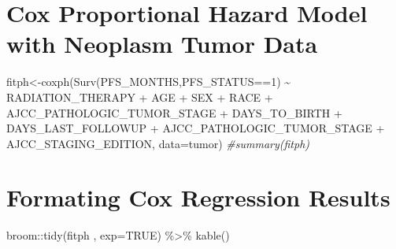 \documentclass[
  11pt,
]{article}
\newenvironment{Shaded}{\begin{snugshade}}{\end{snugshade}}
\newcommand{\AttributeTok}[1]{\textcolor[rgb]{0.77,0.63,0.00}{#1}}
\newcommand{\CommentTok}[1]{\textcolor[rgb]{0.56,0.35,0.01}{\textit{#1}}}
\newcommand{\ConstantTok}[1]{\textcolor[rgb]{0.00,0.00,0.00}{#1}}
\newcommand{\DecValTok}[1]{\textcolor[rgb]{0.00,0.00,0.81}{#1}}
\newcommand{\FunctionTok}[1]{\textcolor[rgb]{0.00,0.00,0.00}{#1}}
\newcommand{\NormalTok}[1]{#1}
\newcommand{\OtherTok}[1]{\textcolor[rgb]{0.56,0.35,0.01}{#1}}
\newcommand{\SpecialCharTok}[1]{\textcolor[rgb]{0.00,0.00,0.00}{#1}}
\begin{document}
\newpage
\section{Cox Proportional Hazard Model with Neoplasm Tumor Data}

\begin{Shaded}
\begin{Highlighting}[]
\NormalTok{fitph}\OtherTok{\textless{}{-}}\FunctionTok{coxph}\NormalTok{(}\FunctionTok{Surv}\NormalTok{(PFS\_MONTHS,PFS\_STATUS}\SpecialCharTok{==}\DecValTok{1}\NormalTok{) }\SpecialCharTok{\textasciitilde{}}\NormalTok{ RADIATION\_THERAPY }\SpecialCharTok{+}
\NormalTok{                AGE }\SpecialCharTok{+}\NormalTok{ SEX }\SpecialCharTok{+}\NormalTok{ RACE }\SpecialCharTok{+}\NormalTok{ AJCC\_PATHOLOGIC\_TUMOR\_STAGE }\SpecialCharTok{+}\NormalTok{ DAYS\_TO\_BIRTH}
                \SpecialCharTok{+}\NormalTok{ DAYS\_LAST\_FOLLOWUP }\SpecialCharTok{+}\NormalTok{ AJCC\_PATHOLOGIC\_TUMOR\_STAGE }\SpecialCharTok{+}
\NormalTok{               AJCC\_STAGING\_EDITION, }
             \AttributeTok{data=}\NormalTok{tumor)}
\CommentTok{\#summary(fitph)}
\end{Highlighting}
\end{Shaded}

\newpage
\section{Formating Cox Regression Results}

\begin{Shaded}
\begin{Highlighting}[]
\NormalTok{broom}\SpecialCharTok{::}\FunctionTok{tidy}\NormalTok{(fitph , }
            \AttributeTok{exp=}\ConstantTok{TRUE}\NormalTok{) }\SpecialCharTok{\%\textgreater{}\%}
  \FunctionTok{kable}\NormalTok{()}
\end{Highlighting}
\end{Shaded}
\end{document}
